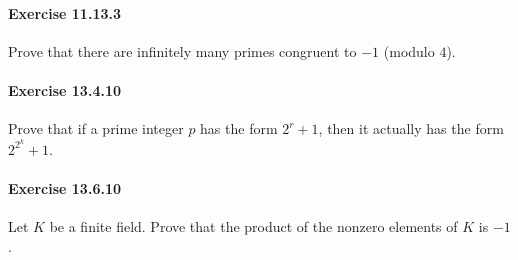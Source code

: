 \documentclass{article}
\begin{document}
\paragraph{Exercise 11.13.3} Prove that there are infinitely many primes congruent to $-1$ (modulo $4$).


\paragraph{Exercise 13.4.10} Prove that if a prime integer $p$ has the form $2^r+1$, then it actually has the form $2^{2^k}+1$.


\paragraph{Exercise 13.6.10} Let $K$ be a finite field. Prove that the product of the nonzero elements of $K$ is $-1$.
\end{document}
